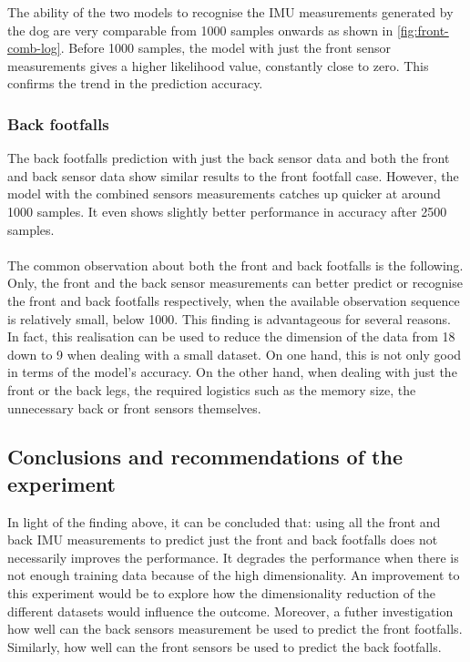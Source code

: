 The ability of the two models to recognise the IMU measurements generated by the dog are very comparable from 1000 samples onwards as shown in \ref{fig:front-comb-log}. Before 1000 samples, the model with just the front sensor measurements gives a higher likelihood value, constantly close to zero. This confirms the trend in the prediction accuracy.

\subsubsection{Back footfalls}

The back footfalls prediction with just the back sensor data and both the front and back sensor data show similar results to the front footfall case. However, the model with the combined sensors measurements catches up quicker at around 1000 samples. It even shows slightly better performance in accuracy after 2500 samples.\\\\
The common observation about both the front and back footfalls is the following. Only, the front and the back sensor measurements can better predict or recognise the front and back footfalls respectively, when the available observation sequence is relatively small, below 1000.
This finding is advantageous for several reasons. In fact, this realisation can be used to reduce the dimension of the data from 18 down to 9 when dealing with a small dataset. On one hand, this is not only good in terms of the model's accuracy. On the other hand, when dealing with just the front or the back legs, the required logistics such as the memory size, the unnecessary back or front sensors themselves. 

\subsection{Conclusions and recommendations of the experiment}
In light of the finding above, it can be concluded that: using all the front and back IMU measurements to predict just the front and back footfalls does not necessarily improves the performance. It degrades the performance when there is not enough training data because of the high dimensionality.
An improvement to this experiment would be to explore how the dimensionality reduction of the different datasets would influence the outcome. Moreover, a futher investigation how well can the back sensors measurement be used to predict the front footfalls. Similarly, how well can the front sensors be used to predict the back footfalls.


